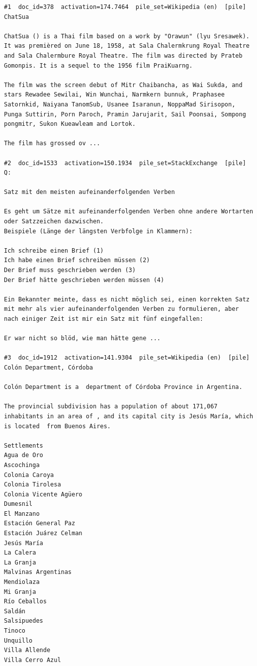 \begin{verbatim}
#1  doc_id=378  activation=174.7464  pile_set=Wikipedia (en)  [pile]
ChatSua

ChatSua () is a Thai film based on a work by "Orawun" (lyu Sresawek). It was premièred on June 18, 1958, at Sala Chalermkrung Royal Theatre and Sala Chalermbure Royal Theatre. The film was directed by Prateb Gomonpis. It is a sequel to the 1956 film PraiKuarng.

The film was the screen debut of Mitr Chaibancha, as Wai Sukda, and stars Rewadee Sewilai, Win Wunchai, Narmkern bunnuk, Praphasee Satornkid, Naiyana TanomSub, Usanee Isaranun, NoppaMad Sirisopon, Punga Suttirin, Porn Paroch, Pramin Jarujarit, Sail Poonsai, Sompong pongmitr, Sukon Kueawleam and Lortok.

The film has grossed ov ...

#2  doc_id=1533  activation=150.1934  pile_set=StackExchange  [pile]
Q:

Satz mit den meisten aufeinanderfolgenden Verben

Es geht um Sätze mit aufeinanderfolgenden Verben ohne andere Wortarten oder Satzzeichen dazwischen.
Beispiele (Länge der längsten Verbfolge in Klammern):

Ich schreibe einen Brief (1)
Ich habe einen Brief schreiben müssen (2)
Der Brief muss geschrieben werden (3)
Der Brief hätte geschrieben werden müssen (4)

Ein Bekannter meinte, dass es nicht möglich sei, einen korrekten Satz mit mehr als vier aufeinanderfolgenden Verben zu formulieren, aber nach einiger Zeit ist mir ein Satz mit fünf eingefallen:

Er war nicht so blöd, wie man hätte gene ...

#3  doc_id=1912  activation=141.9304  pile_set=Wikipedia (en)  [pile]
Colón Department, Córdoba

Colón Department is a  department of Córdoba Province in Argentina.

The provincial subdivision has a population of about 171,067 inhabitants in an area of , and its capital city is Jesús María, which is located  from Buenos Aires.

Settlements
Agua de Oro
Ascochinga
Colonia Caroya
Colonia Tirolesa
Colonia Vicente Agüero
Dumesnil
El Manzano
Estación General Paz
Estación Juárez Celman
Jesús María
La Calera
La Granja
Malvinas Argentinas
Mendiolaza
Mi Granja
Río Ceballos
Saldán
Salsipuedes
Tinoco
Unquillo
Villa Allende
Villa Cerro Azul


\end{verbatim}
